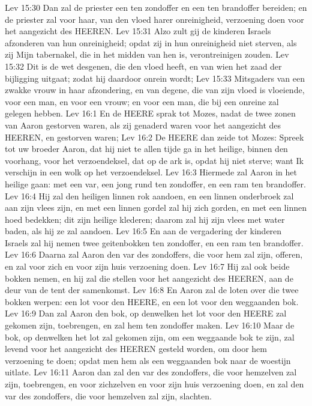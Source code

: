 Lev 15:30  Dan zal de priester een ten zondoffer en een ten brandoffer bereiden; en de priester zal voor haar, van den vloed harer onreinigheid, verzoening doen voor het aangezicht des HEEREN.
Lev 15:31  Alzo zult gij de kinderen Israels afzonderen van hun onreinigheid; opdat zij in hun onreinigheid niet sterven, als zij Mijn tabernakel, die in het midden van hen is, verontreinigen zouden.
Lev 15:32  Dit is de wet desgenen, die den vloed heeft, en van wien het zaad der bijligging uitgaat; zodat hij daardoor onrein wordt;
Lev 15:33  Mitsgaders van een zwakke vrouw in haar afzondering, en van degene, die van zijn vloed is vloeiende, voor een man, en voor een vrouw; en voor een man, die bij een onreine zal gelegen hebben.
Lev 16:1  En de HEERE sprak tot Mozes, nadat de twee zonen van Aaron gestorven waren, als zij genaderd waren voor het aangezicht des HEEREN, en gestorven waren;
Lev 16:2  De HEERE dan zeide tot Mozes: Spreek tot uw broeder Aaron, dat hij niet te allen tijde ga in het heilige, binnen den voorhang, voor het verzoendeksel, dat op de ark is, opdat hij niet sterve; want Ik verschijn in een wolk op het verzoendeksel.
Lev 16:3  Hiermede zal Aaron in het heilige gaan: met een var, een jong rund ten zondoffer, en een ram ten brandoffer.
Lev 16:4  Hij zal den heiligen linnen rok aandoen, en een linnen onderbroek zal aan zijn vlees zijn, en met een linnen gordel zal hij zich gorden, en met een linnen hoed bedekken; dit zijn heilige klederen; daarom zal hij zijn vlees met water baden, als hij ze zal aandoen.
Lev 16:5  En aan de vergadering der kinderen Israels zal hij nemen twee geitenbokken ten zondoffer, en een ram ten brandoffer.
Lev 16:6  Daarna zal Aaron den var des zondoffers, die voor hem zal zijn, offeren, en zal voor zich en voor zijn huis verzoening doen.
Lev 16:7  Hij zal ook beide bokken nemen, en hij zal die stellen voor het aangezicht des HEEREN, aan de deur van de tent der samenkomst.
Lev 16:8  En Aaron zal de loten over die twee bokken werpen: een lot voor den HEERE, en een lot voor den weggaanden bok.
Lev 16:9  Dan zal Aaron den bok, op denwelken het lot voor den HEERE zal gekomen zijn, toebrengen, en zal hem ten zondoffer maken.
Lev 16:10  Maar de bok, op denwelken het lot zal gekomen zijn, om een weggaande bok te zijn, zal levend voor het aangezicht des HEEREN gesteld worden, om door hem verzoening te doen; opdat men hem als een weggaanden bok naar de woestijn uitlate.
Lev 16:11  Aaron dan zal den var des zondoffers, die voor hemzelven zal zijn, toebrengen, en voor zichzelven en voor zijn huis verzoening doen, en zal den var des zondoffers, die voor hemzelven zal zijn, slachten.
